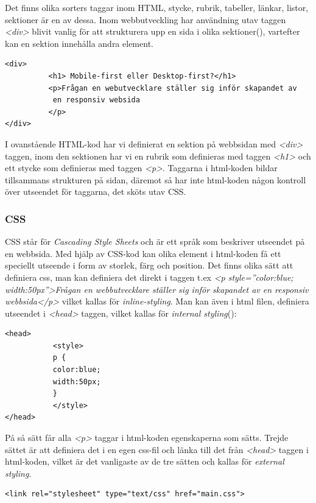 \documentclass[11pt]{article}
\begin{document}
Det finns olika sorters taggar inom HTML, stycke, rubrik, tabeller, länkar, listor, sektioner är en av dessa. Inom webbutveckling har användning utav taggen \textit{<div>} blivit vanlig för att strukturera upp en sida i olika sektioner(\cite{divtable}), vartefter kan en sektion innehålla andra element.


\begin{verbatim}
<div> 
          <h1> Mobile-first eller Desktop-first?</h1>
          <p>Frågan en webutvecklare ställer sig inför skapandet av
           en responsiv websida
          </p>
</div>
\end{verbatim}
\vspace{1cm}

I ovanstående HTML-kod har vi definierat en sektion på webbsidan med \textit{<div>} taggen, inom den sektionen har vi en rubrik som definieras med taggen \textit{<h1>} och ett stycke som definieras med taggen \textit{<p>}. Taggarna i html-koden bildar tillsammans strukturen på sidan, däremot så har inte html-koden någon kontroll över utseendet för taggarna, det sköts utav CSS.  

\subsubsection{CSS}
CSS står för \textit{Cascading Style Sheets} och är ett språk som beskriver utseendet på en webbsida.
Med hjälp av CSS-kod kan olika element i html-koden få ett speciellt utseende i form av storlek, färg och position. Det finns olika sätt att definiera css, man kan definiera det direkt i taggen t.ex \textit{<p style=”color:blue; width:50px”>Frågan en webbutvecklare ställer sig inför skapandet av en responsiv webbsida</p>} vilket kallas för \textit{inline-styling}. Man kan även i html filen, definiera utseendet i \textit{<head>} taggen, vilket kallas för \textit{internal styling}(\cite{css}):

\vspace{0.5cm}
\begin{verbatim}
<head>
           <style>
           p {
           color:blue;
           width:50px;
           }
           </style>
</head>
\end{verbatim}
\vspace{0.5cm}

På så sätt får alla \textit{<p>} taggar i html-koden egenskaperna som sätts. Trejde sättet är att definiera det i en egen css-fil och länka till det från \textit{<head>} taggen i html-koden, vilket är det vanligaste av de tre sätten och kallas för \textit{external styling}. 
\vspace{0.3cm}
\begin{verbatim}
<link rel="stylesheet" type="text/css" href="main.css">
\end{verbatim}
\vspace{0.5cm}
\end{document}
